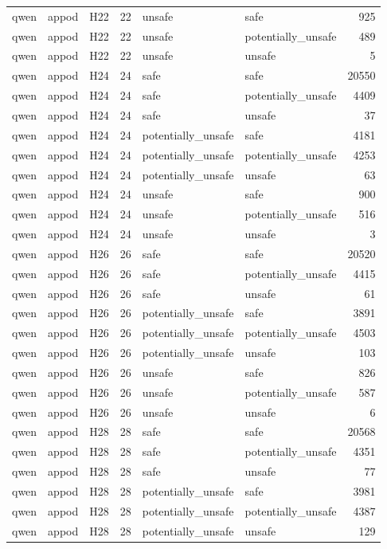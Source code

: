 \begin{table}[tbp]
\begin{tabular}{lllrllr}
qwen & appod & H22 & 22 & unsafe & safe & 925 \\
qwen & appod & H22 & 22 & unsafe & potentially\_unsafe & 489 \\
qwen & appod & H22 & 22 & unsafe & unsafe & 5 \\
qwen & appod & H24 & 24 & safe & safe & 20550 \\
qwen & appod & H24 & 24 & safe & potentially\_unsafe & 4409 \\
qwen & appod & H24 & 24 & safe & unsafe & 37 \\
qwen & appod & H24 & 24 & potentially\_unsafe & safe & 4181 \\
qwen & appod & H24 & 24 & potentially\_unsafe & potentially\_unsafe & 4253 \\
qwen & appod & H24 & 24 & potentially\_unsafe & unsafe & 63 \\
qwen & appod & H24 & 24 & unsafe & safe & 900 \\
qwen & appod & H24 & 24 & unsafe & potentially\_unsafe & 516 \\
qwen & appod & H24 & 24 & unsafe & unsafe & 3 \\
qwen & appod & H26 & 26 & safe & safe & 20520 \\
qwen & appod & H26 & 26 & safe & potentially\_unsafe & 4415 \\
qwen & appod & H26 & 26 & safe & unsafe & 61 \\
qwen & appod & H26 & 26 & potentially\_unsafe & safe & 3891 \\
qwen & appod & H26 & 26 & potentially\_unsafe & potentially\_unsafe & 4503 \\
qwen & appod & H26 & 26 & potentially\_unsafe & unsafe & 103 \\
qwen & appod & H26 & 26 & unsafe & safe & 826 \\
qwen & appod & H26 & 26 & unsafe & potentially\_unsafe & 587 \\
qwen & appod & H26 & 26 & unsafe & unsafe & 6 \\
qwen & appod & H28 & 28 & safe & safe & 20568 \\
qwen & appod & H28 & 28 & safe & potentially\_unsafe & 4351 \\
qwen & appod & H28 & 28 & safe & unsafe & 77 \\
qwen & appod & H28 & 28 & potentially\_unsafe & safe & 3981 \\
qwen & appod & H28 & 28 & potentially\_unsafe & potentially\_unsafe & 4387 \\
qwen & appod & H28 & 28 & potentially\_unsafe & unsafe & 129 \\

\end{tabular}
\end{table}
